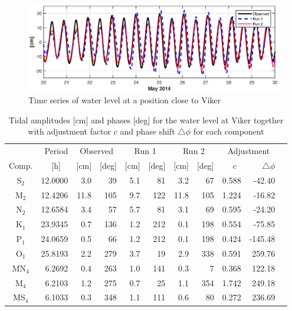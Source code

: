 \begin{figure}[!t]
\centering
\includegraphics[width=\textwidth]{fig_Viker_timeseries}
\caption{Time series of water level at a position close to Viker}
\label{fig:Viker_timeseries}
\end{figure}



\begin{table}[ht]
\caption{Tidal amplitudes [cm] and phases [deg] for the water level at Viker together with adjustment factor $c$ and phase shift $\triangle \phi$ for each component}
\label{tab:Viker}
\centering
\begin{tabular}{crrrrrrrrrr} \hline
       & Period & \multicolumn{2}{c}{Observed} & \multicolumn{2}{c}{Run 1} & \multicolumn{2}{c}{Run 2} & \multicolumn{2}{c}{Adjustment} \\
Comp.  & [h] $\;\;$ & [cm] & [deg] & [cm] & [deg] & [cm] & [deg] & $c\;\;$ & $\triangle \phi$  \\ \hline 
S$_2$  &  12.0000 &   3.0 &  39 &    5.1 &  81 &    3.2 &  67 &    0.588 &   -42.40   \\
M$_2$  &  12.4206 &  11.8 & 105 &    9.7 & 122 &   11.8 & 105 &    1.224 &   -16.82   \\
N$_2$  &  12.6584 &   3.4 &  57 &    5.7 &  81 &    3.1 &  69 &    0.595 &   -24.20   \\
K$_1$  &  23.9345 &   0.7 & 136 &    1.2 & 212 &    0.1 & 198 &    0.554 &   -75.85   \\
P$_1$  &  24.0659 &   0.5 &  66 &    1.2 & 212 &    0.1 & 198 &    0.424 &  -145.48   \\
O$_1$  &  25.8193 &   2.2 & 279 &    3.7 &  19 &    2.9 & 338 &    0.591 &   259.76   \\
MN$_4$ &   6.2692 &   0.4 & 263 &    1.0 & 141 &    0.3 &   7 &    0.368 &   122.18   \\
M$_4$  &   6.2103 &   1.2 & 275 &    0.7 &  25 &    1.1 & 354 &    1.742 &   249.18   \\
MS$_4$ &   6.1033 &   0.3 & 348 &    1.1 & 111 &    0.6 &  80 &    0.272 &   236.69   \\ \hline
\end{tabular}
\end{table}


